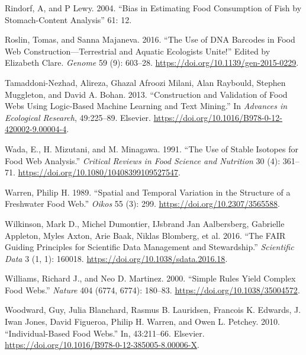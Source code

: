 \documentclass{article}
\newlength{\cslhangindent}
\newlength{\cslentryspacingunit} %
\newenvironment{CSLReferences}[2] %
 {%
  \setlength{\parindent}{0pt}
  \ifodd #1
  \let\oldpar\par
  \def\par{\hangindent=\cslhangindent\oldpar}
  \fi
  \setlength{\parskip}{#2\cslentryspacingunit}
 }%
 {}
\begin{document}
\begin{CSLReferences}{1}{0}
\leavevmode{}%
Rindorf, A, and P Lewy. 2004. {``Bias in Estimating Food Consumption of
Fish by Stomach-Content Analysis''} 61: 12.

\leavevmode{}%
Roslin, Tomas, and Sanna Majaneva. 2016. {``The Use of {DNA} Barcodes in
Food Web Construction---Terrestrial and Aquatic Ecologists Unite!''}
Edited by Elizabeth Clare. \emph{Genome} 59 (9): 603--28.
\url{https://doi.org/10.1139/gen-2015-0229}.

\leavevmode{}%
Tamaddoni-Nezhad, Alireza, Ghazal Afroozi Milani, Alan Raybould, Stephen
Muggleton, and David A. Bohan. 2013. {``Construction and {Validation} of
{Food Webs Using Logic}-{Based Machine Learning} and {Text Mining}.''}
In \emph{Advances in {Ecological Research}}, 49:225--89. {Elsevier}.
\url{https://doi.org/10.1016/B978-0-12-420002-9.00004-4}.

\leavevmode{}%
Wada, E., H. Mizutani, and M. Minagawa. 1991. {``The Use of Stable
Isotopes for Food Web Analysis.''} \emph{Critical Reviews in Food
Science and Nutrition} 30 (4): 361--71.
\url{https://doi.org/10.1080/10408399109527547}.

\leavevmode{}%
Warren, Philip H. 1989. {``Spatial and {Temporal Variation} in the
{Structure} of a {Freshwater Food Web}.''} \emph{Oikos} 55 (3): 299.
\url{https://doi.org/10.2307/3565588}.

\leavevmode{}%
Wilkinson, Mark D., Michel Dumontier, IJsbrand Jan Aalbersberg,
Gabrielle Appleton, Myles Axton, Arie Baak, Niklas Blomberg, et al.
2016. {``The {FAIR Guiding Principles} for Scientific Data Management
and Stewardship.''} \emph{Scientific Data} 3 (1, 1): 160018.
\url{https://doi.org/10.1038/sdata.2016.18}.

\leavevmode{}%
Williams, Richard J., and Neo D. Martinez. 2000. {``Simple Rules Yield
Complex Food Webs.''} \emph{Nature} 404 (6774, 6774): 180--83.
\url{https://doi.org/10.1038/35004572}.

\leavevmode{}%
Woodward, Guy, Julia Blanchard, Rasmus B. Lauridsen, Francois K.
Edwards, J. Iwan Jones, David Figueroa, Philip H. Warren, and Owen L.
Petchey. 2010. {``Individual-Based Food Webs.''} In, 43:211--66.
Elsevier. \url{https://doi.org/10.1016/B978-0-12-385005-8.00006-X}.

\end{CSLReferences}



\end{document}
